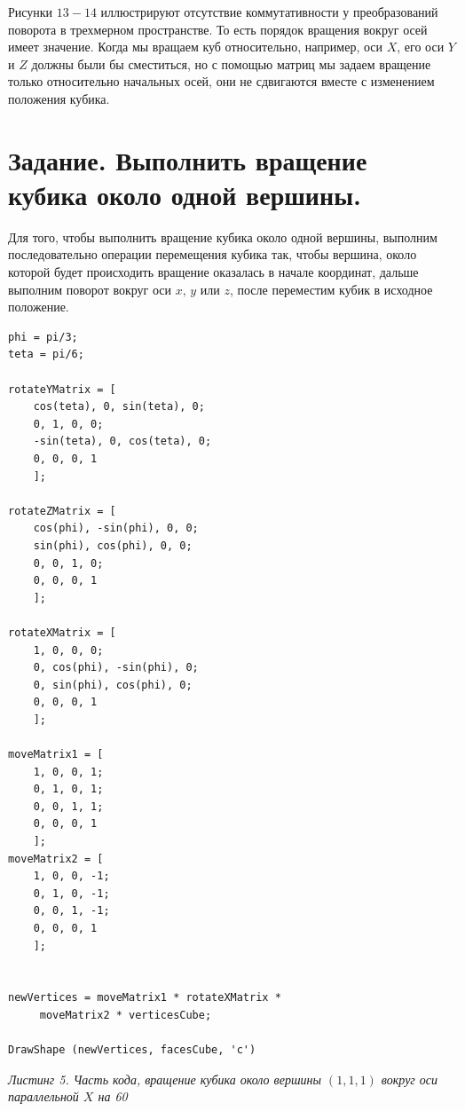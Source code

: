 \documentclass[a5paper, 10pt]{article}
\theoremstyle{definition}
\theoremstyle{plain}
\theoremstyle{remark}
\begin{document}
Рисунки $13-14$ иллюстрируют отсутствие коммутативности у преобразований поворота в трехмерном пространстве. То есть порядок вращения вокруг осей имеет значение. Когда мы вращаем куб относительно, например, оси $X$, его оси $Y$ и $Z$ должны были бы сместиться, но с помощью матриц мы задаем вращение только относительно начальных осей, они не сдвигаются вместе с изменением положения кубика.














\newpage
\section{Задание. Выполнить вращение кубика около одной вершины.}
Для того, чтобы выполнить вращение кубика около одной вершины, выполним последовательно операции перемещения кубика так, чтобы вершина, около которой будет происходить вращение оказалась в начале координат, дальше выполним поворот вокруг оси $x, \, y$ или $z$, после переместим кубик в исходное положение.

\begin{center}
\begin{lstlisting}
phi = pi/3;
teta = pi/6;

rotateYMatrix = [
    cos(teta), 0, sin(teta), 0;
    0, 1, 0, 0;
    -sin(teta), 0, cos(teta), 0;
    0, 0, 0, 1
    ];

rotateZMatrix = [
    cos(phi), -sin(phi), 0, 0;
    sin(phi), cos(phi), 0, 0;
    0, 0, 1, 0;
    0, 0, 0, 1
    ];

rotateXMatrix = [
    1, 0, 0, 0;
    0, cos(phi), -sin(phi), 0;
    0, sin(phi), cos(phi), 0;
    0, 0, 0, 1
    ];

moveMatrix1 = [
    1, 0, 0, 1;
    0, 1, 0, 1;
    0, 0, 1, 1;
    0, 0, 0, 1
    ];
moveMatrix2 = [
    1, 0, 0, -1;
    0, 1, 0, -1;
    0, 0, 1, -1;
    0, 0, 0, 1
    ];


newVertices = moveMatrix1 * rotateXMatrix *
	 moveMatrix2 * verticesCube;

DrawShape (newVertices, facesCube, 'c')
\end{lstlisting}
\textit{Листинг 5. Часть кода, вращение кубика около вершины $(1, 1, 1)$ вокруг оси параллельной $X$ на 60\textdegree}
\end{center}
\end{document}
